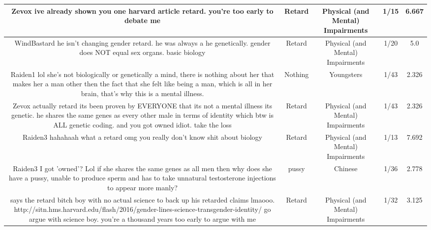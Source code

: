 \documentclass[11pt]{article}
\newlength\mylength
\begin{document}
\begin{center}
\begin{longtable}{|C{.40\mylength}|C{.30\mylength}|C{.15\mylength}|C{.15\mylength}|C{.15\mylength}|}
  Zevox ive already shown you one harvard article retard. you're too early to debate me  & Retard & Physical (and Mental) Impairments & 1/15 & 6.667 \\  \hline
   WindBastard  he isn't changing gender retard. he was always a he genetically. gender does NOT equal sex organs.  basic biology  & Retard & Physical (and Mental) Impairments & 1/20 & 5.0 \\  \hline
  Raiden1 lol she's not biologically or genetically a mind, there is nothing about her that makes her a man other then the fact that she felt like being a man, which is all in her brain,  that's why this is a mental illness.  & Nothing & Youngsters & 1/43 & 2.326 \\  \hline
  Zevox actually retard its been proven by EVERYONE that its not a mental illness its genetic.  he shares the same genes as every other male in terms of identity which btw is ALL genetic coding.  and you got owned idiot. take the loss  & Retard & Physical (and Mental) Impairments & 1/43 & 2.326 \\  \hline
  Raiden3 hahahaah what a retard omg you really don't know shit about biology  & Retard & Physical (and Mental) Impairments & 1/13 & 7.692 \\  \hline
  Raiden3 I got 'owned'? Lol if she shares the same genes as all men then why does she have a pussy, unable to produce sperm and has to take unnatural testosterone injections to appear more manly?  & pussy & Chinese & 1/36 & 2.778 \\  \hline
  says the retard bitch boy with no actual science to back up his retarded claims lmaooo. http://sitn.hms.harvard.edu/flash/2016/gender-lines-science-transgender-identity/ go argue with science boy.  you're a thousand years too early to argue with me  & Retard & Physical (and Mental) Impairments & 1/32 & 3.125 \\  \hline

\end{longtable}
\end{center}
\end{document}
